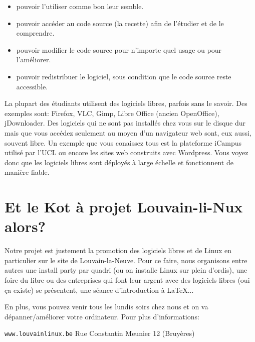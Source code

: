 \documentclass[12pt,a4paper]{article}
\begin{document}
\begin{itemize}
\item pouvoir l’utiliser comme bon leur semble.
\item pouvoir accéder au code source (la recette) afin de l’étudier et de le comprendre.
\item pouvoir modifier le code source pour n’importe quel usage ou pour l’améliorer.
\item pouvoir redistribuer le logiciel, sous condition que le code source reste accessible.
\end{itemize}

La plupart des étudiants utilisent des logiciels libres, parfois sans le savoir.
Des exemples sont: Firefox, VLC, Gimp, Libre Office (ancien OpenOffice), jDownloader.
Des logiciels qui ne sont pas installés chez vous sur le disque dur mais
que vous accédez seulement au moyen d'un navigateur web sont, eux aussi, souvent libre.
Un exemple que vous conaissez tous est la plateforme iCampus utilisé par l'UCL
ou encore les sites web construits avec Wordpress. Vous voyez donc que les logiciels 
libres sont déployés à large échelle et fonctionnent de manière fiable.

\section*{Et le Kot à projet Louvain-li-Nux alors?}
Notre projet est justement la promotion des logiciels libres et de Linux en particulier sur le site de Louvain-la-Neuve.
Pour ce faire, nous organisons entre autres une install party par quadri (ou on installe Linux sur plein d'ordis),
une foire du libre ou des entreprises qui font leur argent avec des logiciels libres (oui ça existe) se présentent,
une séance d'introduction à \LaTeX{}...

En plus, vous pouvez venir tous les lundis soirs chez nous et on va dépanner/améliorer votre ordinateur.
Pour plus d'informations:

\begin{center}\texttt{www.louvainlinux.be} \hspace{0.5cm}Rue Constantin Meunier 12 (Bruyères)\end{center}
                                                                                                                       
\end{document}
